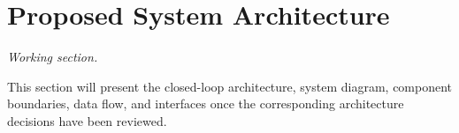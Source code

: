 \section{Proposed System Architecture}
\label{sec:architecture}

\textit{Working section.}

This section will present the closed-loop architecture, system diagram, component
boundaries, data flow, and interfaces once the corresponding architecture decisions
have been reviewed.
